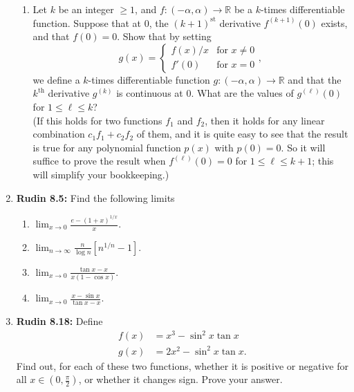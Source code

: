 \documentclass[11pt]{article}
\newcommand{\R}{\mathbb{R}}
\begin{document}
\begin{enumerate}
\begin{enumerate}
        \item Let \(k\) be an integer \(\geq 1\), and \(f \colon (-\alpha, \alpha) \to \R\) be a \(k\)-times 
          differentiable function.  Suppose that at \(0\), the \((k+1)^{\text{st}}\) derivative \(f^{(k+1)}(0)\) 
          exists, and that \(f(0) = 0\).  Show that by setting
          \[
            g(x) = \begin{cases}
              f(x)/x & \text{for } x \neq 0 \\
              f'(0) & \text{for } x = 0
            \end{cases},
          \]
          we define a \(k\)-times differentiable function \(g \colon (-\alpha, \alpha) \to \R\) and that the 
          \(k^{\text{th}}\) derivative \(g^{(k)}\) is continuous at \(0\).  What are the values of \(g^{(\ell)}(0)\) 
          for \(1 \leq \ell \leq k\)? \\
          (If this holds for two functions \(f_1\) and \(f_2\), then it holds for any linear combination 
          \(c_1f_1 + c_2f_2\) of them, and it is quite easy to see that the result is true for any polynomial 
          function \(p(x)\) with \(p(0) = 0\).  So it will suffice to prove the result when \(f^{(\ell)}(0) = 0\) 
          for \(1 \leq \ell \leq k+1\); this will simplify your bookkeeping.)
      \end{enumerate}
      \newpage

    \item \textbf{Rudin 8.5:} Find the following limits
      \begin{enumerate}
        \item \(\displaystyle\lim_{x \to 0} \frac{e - (1+x)^{1/x}}{x}\).
        \item \(\displaystyle\lim_{n \to \infty} \frac{n}{\log n}[n^{1/n} - 1]\).
        \item \(\displaystyle\lim_{x \to 0} \frac{\tan x - x}{x(1 - \cos x)}\).
        \item \(\displaystyle\lim_{x \to 0} \frac{x - \sin x}{\tan x - x}\).
      \end{enumerate}
      \newpage

    \item \textbf{Rudin 8.18:} Define 
      \begin{align*}
        f(x) &= x^3 - \sin^2 x \tan x \\
        g(x) &= 2x^2 - \sin^2 x \tan x.
      \end{align*}
      Find out, for each of these two functions, whether it is positive or negative for all 
      \(x \in \left(0, \frac{\pi}{2}\right)\), or whether it changes sign.  Prove your answer.
  \end{enumerate}
\end{document}

